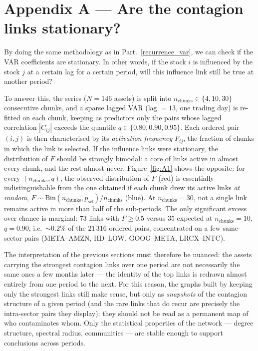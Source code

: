 \section*{Appendix A --- Are the contagion links stationary?}

By doing the same methodology as in Part.~\ref{recurrence_var}, we can check if
the VAR coefficients are stationary. In other words, if the stock $i$ is
influenced by the stock $j$ at a certain lag for a certain period, will this
influence link still be true at another period?

To answer this, the series ($N = 146$ assets) is split into
$n_{\mathrm{chunks}} \in \{4, 10, 30\}$ consecutive chunks, and a sparse lagged
VAR (lag $= 13$, one trading day) is re-fitted on each chunk, keeping as
predictors only the pairs whose lagged correlation $|C_{ij}|$ exceeds the
quantile $q \in \{0.80, 0.90, 0.95\}$. Each ordered pair $(i,j)$ is then
characterised by its \emph{activation frequency} $F_{ij}$, the fraction of
chunks in which the link is selected. If the influence links were stationary,
the distribution of $F$ should be strongly bimodal: a core of links active in
almost every chunk, and the rest almost never. Figure~\ref{fig:A1} shows the
opposite: for every $(n_{\mathrm{chunks}}, q)$, the observed distribution of $F$
(red) is essentially indistinguishable from the one obtained if each chunk drew
its active links \emph{at random}, $F \sim \mathrm{Bin}(n_{\mathrm{chunks}},
p_{\mathrm{sel}})/n_{\mathrm{chunks}}$ (blue). At $n_{\mathrm{chunks}} = 30$,
not a single link remains active in more than half of the sub-periods. The only
significant excess over chance is marginal: $73$ links with $F \ge 0.5$ versus
$35$ expected at $n_{\mathrm{chunks}} = 10$, $q = 0.90$, i.e.\ ${\sim}0.2\%$ of
the $21\,316$ ordered pairs, concentrated on a few same-sector pairs
(META--AMZN, HD--LOW, GOOG--META, LRCX--INTC).

The interpretation of the previous sections must therefore be nuanced: the
assets carrying the strongest contagion links over one period are not
necessarily the same ones a few months later --- the identity of the top links
is redrawn almost entirely from one period to the next. For this reason, the
graphs built by keeping only the strongest links still make sense, but only as
\emph{snapshots} of the contagion structure of a given period (and the rare
links that do recur are precisely the intra-sector pairs they display); they
should not be read as a permanent map of who contaminates whom. Only the
statistical properties of the network --- degree structure, spectral radius,
communities --- are stable enough to support conclusions across periods.

